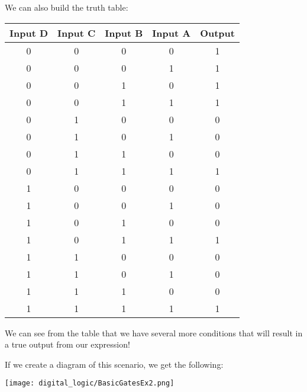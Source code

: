 \begin{example}
        We can also build the truth table:
        \begin{center}
            \begin{tabular}{c c c c | c}
                \toprule
                Input D & Input C & Input B & Input A & Output \\
                \midrule
                    0    &    0     &    0     &    0     &    1    \\
                    0    &    0     &    0     &    1     &    1    \\
                    0    &    0     &    1     &    0     &    1    \\
                    0    &    0     &    1     &    1     &    1    \\
                    0    &    1     &    0     &    0     &    0    \\
                    0    &    1     &    0     &    1     &    0    \\
                    0    &    1     &    1     &    0     &    0    \\
                    0    &    1     &    1     &    1     &    1    \\
                    1    &    0     &    0     &    0     &    0    \\
                    1    &    0     &    0     &    1     &    0    \\
                    1    &    0     &    1     &    0     &    0    \\
                    1    &    0     &    1     &    1     &    1    \\
                    1    &    1     &    0     &    0     &    0    \\
                    1    &    1     &    0     &    1     &    0    \\
                    1    &    1     &    1     &    0     &    0    \\
                    1    &    1     &    1     &    1     &    1    \\
                \bottomrule
            \end{tabular}
        \end{center}
        We can see from the table that we have several more conditions that will result in a true output from our expression!

        If we create a diagram of this scenario, we get the following:
        \begin{center}
            \texttt{[image: digital\_logic/BasicGatesEx2.png]}
        \end{center}

    \end{example}

